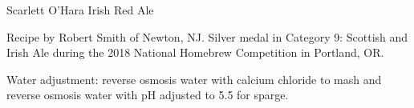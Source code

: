 \begin{recipe}{Scarlett O'Hara Irish Red Ale}

\begin{aboutblock}
Recipe by Robert Smith of Newton, NJ. Silver medal in Category 9: Scottish and
Irish Ale during the 2018 National Homebrew Competition in Portland, OR.
\sourceaha
\end{aboutblock}


\begin{methodandtiming}
 
\begin{mashsteps}
\end{mashsteps}

\begin{fermentationsteps}
\end{fermentationsteps}

\begin{directions}
Water adjustment:  reverse osmosis water with  calcium
chloride to mash and  reverse osmosis water with pH adjusted to 5.5
for sparge.
\end{directions}

\end{methodandtiming}

\recipebreak

\begin{ingredientsblock}

\begin{malts}
\end{malts}

\begin{hops}
\end{hops}


\end{ingredientsblock}

\end{recipe}

